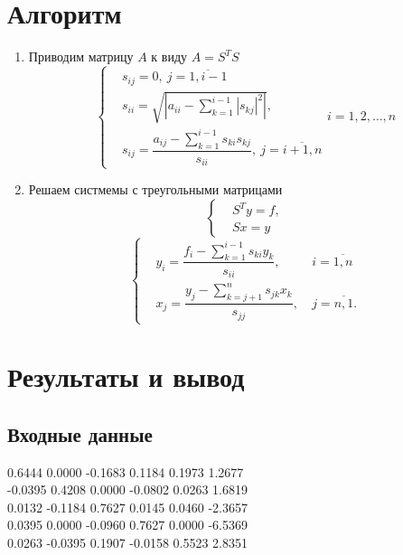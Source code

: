 \documentclass[11.4pt]{article}
\begin{document}
\section{Алгоритм}
\begin{enumerate}
	\item Приводим матрицу $A$ к виду $A=S^TS$
	\begin{equation*}
	\left\{
	\begin{aligned}
		&s_{ij} = 0, \: j = \overline{1, i-1}\\
		&s_{ii} =\sqrt{\left|a_{ii}-\sum\limits_{k=1}^{i-1}|s_{kj}|^2\right|}, \\ 
		&s_{ij} = \dfrac{a_{ij} -\sum\limits_{k=1}^{i-1}s_{ki}s_{kj}}{s_{ii}}, \: j = \overline{i+1,n}
	\end{aligned}
	\right. 
	i = 1, 2, \ldots, n
	\end{equation*}
	\item Решаем систмемы с треугольными матрицами
	\begin{equation*}
		\left\{
			\begin{aligned}
				&S^Ty=f,\\
				&Sx =y
			\end{aligned}
		\right.
	\end{equation*}
	\begin{equation*}
		\left\{
		\begin{aligned}			
				&y_i = \dfrac{f_i - \sum\limits_{k=1}^{i-1}s_{ki}y_k}{s_{ii}}, \: &i=\overline{1, n} \\
				&x_j = \dfrac{y_j - \sum\limits_{k = j+1}^{n}s_{jk}x_k}{s_{jj}}, \: &j =\overline{n, 1}.
		\end{aligned}
		\right.
	\end{equation*}
\end{enumerate}
\section{Результаты и вывод}
	\subsection{Входные данные}
		0.6444 0.0000 -0.1683 0.1184 0.1973 1.2677\\
		-0.0395 0.4208 0.0000 -0.0802 0.0263 1.6819\\
		0.0132 -0.1184 0.7627 0.0145 0.0460 -2.3657\\
		0.0395 0.0000 -0.0960 0.7627 0.0000 -6.5369\\
		0.0263 -0.0395 0.1907 -0.0158 0.5523 2.8351\\
\end{document}
